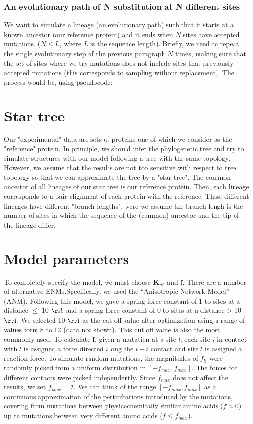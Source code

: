 \documentclass{article}
\begin{document}
\begin{multicols}{2}
{\subsubsection*{An evolutionary path of N substitution at N different sites}
We want to simulate a lineage (an evolutionary path) such that it starts at a known ancestor (our reference protein) and it ends when $N$ sites have accepted mutations. ($N \le L$, where $L$ is the sequence length). Briefly, we need to repeat the single evolutionary step of the previous paragraph $N$ times, making sure that the set of sites where we try mutations does not include sites that previously accepted mutations (this corresponds to sampling without replacement). The process would be, using pseudocode:

\section*{Star tree}
Our "experimental" data are sets of proteins one of which we consider as the "reference" protein. In principle, we should infer the phylogenetic tree and try to simulate structures with our model following a tree with the same topology. However, we assume that the results are not too sensitive with respect to tree topology so that we can approximate the tree by a "star tree". The common ancestor of all lineages of our star tree is our reference protein. Then, each lineage corresponds to a pair alignment of each protein with the reference. Thus, different lineages have different "branch lengths", were we assume the branch lengh is the number of sites in which the sequence of the (common) ancestor and the tip of the lineage differ. 

\section*{Model parameters}
To completely specify the model, we must choose $\mathbf{K}_{wt}$ and $\mathbf{f}$. There are a number of alternative ENMs.Specifically, we used the ``Anisotropic Network Model'' (ANM). Following this model, we gave a spring force constant of 1 to sites at a distance $\leq$ 10 $\AA$ and a spring force constant of 0 to sites at a distance > 10 $\AA$. We selected 10 $\AA$ as the cut off value after optimization using a range of values form 8 to 12 (data not shown). This cut off value is also the most commonly used.
To calculate $\mathbf{f}$, given a mutation at a site $l$, each site $i$ in contact with $l$ is assigned a force directed along the $l-i$ contact and site $l$ is assigned a reaction force. To simulate random mutations, the magnitudes of $f_{li}$ were randomly picked from a uniform distribution in $[-f_{max},f_{max}]$. The forces for different contacts were picked independently. Since $f_{max}$ does not affect the results, we set
$f_{max} = 2$. We can think of the range $[-f_{max}, f_{max}]$ as a continuous approximation of the perturbations introduced by the mutations, covering
from mutations between physicochemically similar amino acids ($f \approx 0$) up to mutations between very different amino acids ($f \leq f_{max}$).

}
\end{multicols}
\end{document}
